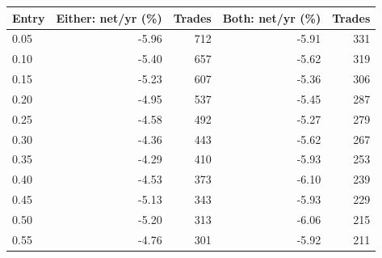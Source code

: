 \begin{tabular}{@{}lrrrr@{}}
\toprule
Entry & Either: net/yr (\%) & Trades & Both: net/yr (\%) & Trades \\
\midrule
0.05 & -5.96 & 712 & -5.91 & 331 \\
0.10 & -5.40 & 657 & -5.62 & 319 \\
0.15 & -5.23 & 607 & -5.36 & 306 \\
0.20 & -4.95 & 537 & -5.45 & 287 \\
0.25 & -4.58 & 492 & -5.27 & 279 \\
0.30 & -4.36 & 443 & -5.62 & 267 \\
0.35 & -4.29 & 410 & -5.93 & 253 \\
0.40 & -4.53 & 373 & -6.10 & 239 \\
0.45 & -5.13 & 343 & -5.93 & 229 \\
0.50 & -5.20 & 313 & -6.06 & 215 \\
0.55 & -4.76 & 301 & -5.92 & 211 \\
\bottomrule
\end{tabular}
